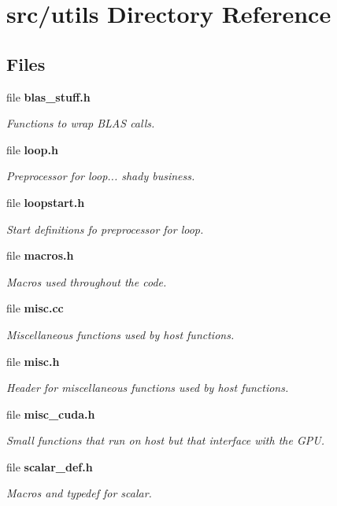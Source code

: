 \section{src/utils Directory Reference}
\label{dir_313caf1132e152dd9b58bea13a4052ca}
\subsection*{Files}
\begin{DoxyCompactItemize}
\item 
file {\bf blas\-\_\-stuff.\-h}
\begin{DoxyCompactList}\small\item\em Functions to wrap B\-L\-A\-S calls. \end{DoxyCompactList}\item 
file {\bf loop.\-h}
\begin{DoxyCompactList}\small\item\em Preprocessor for loop... shady business. \end{DoxyCompactList}\item 
file {\bf loopstart.\-h}
\begin{DoxyCompactList}\small\item\em Start definitions fo preprocessor for loop. \end{DoxyCompactList}\item 
file {\bf macros.\-h}
\begin{DoxyCompactList}\small\item\em Macros used throughout the code. \end{DoxyCompactList}\item 
file {\bf misc.\-cc}
\begin{DoxyCompactList}\small\item\em Miscellaneous functions used by host functions. \end{DoxyCompactList}\item 
file {\bf misc.\-h}
\begin{DoxyCompactList}\small\item\em Header for miscellaneous functions used by host functions. \end{DoxyCompactList}\item 
file {\bf misc\-\_\-cuda.\-h}
\begin{DoxyCompactList}\small\item\em Small functions that run on host but that interface with the G\-P\-U. \end{DoxyCompactList}\item 
file {\bf scalar\-\_\-def.\-h}
\begin{DoxyCompactList}\small\item\em Macros and typedef for scalar. \end{DoxyCompactList}\end{DoxyCompactItemize}
